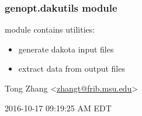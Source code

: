 \documentclass[letterpaper,10pt,english]{sphinxmanual}
\begin{document}
\subsubsection{genopt.dakutils module}
\label{src/apidocs/dakutils:genopt-dakutils-module}\label{src/apidocs/dakutils::doc}\label{src/apidocs/dakutils:module-genopt.dakutils}
module contains utilities:
\begin{itemize}
\item {} 
generate dakota input files

\item {} 
extract data from output files

\end{itemize}

Tong Zhang \textless{}\href{mailto:zhangt@frib.msu.edu}{zhangt@frib.msu.edu}\textgreater{}

2016-10-17 09:19:25 AM EDT
\end{document}
